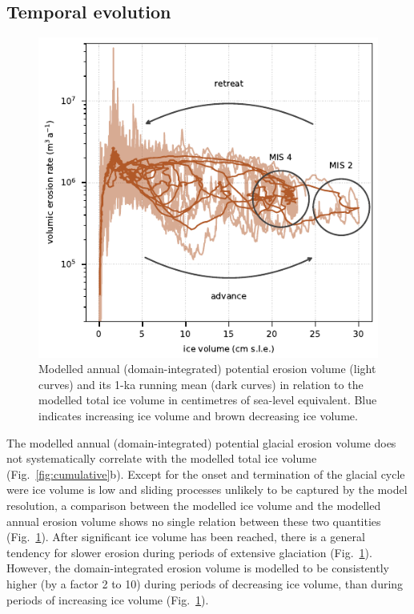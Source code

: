 \documentclass[esurf, manuscript]{copernicus}
\begin{document}
\subsection{Temporal evolution}

    \begin{figure}
      \centerline{\includegraphics{alpero_evolution}}
      \caption{%
        Modelled annual (domain-integrated) potential erosion volume (light
        curves) and its 1-ka running mean (dark curves) in relation to the
        modelled total ice volume in centimetres of sea-level equivalent. Blue
        indicates increasing ice volume and brown decreasing ice volume.}
      \label{fig:evolution}
    \end{figure}

    The modelled annual (domain-integrated) potential glacial erosion volume
    does not systematically correlate with the modelled total ice volume
    (Fig.~\ref{fig:cumulative}b). Except for the onset and termination of the
    glacial cycle were ice volume is low and sliding processes unlikely to be
    captured by the model resolution, a comparison between the modelled ice
    volume and the modelled annual erosion volume shows no single relation
    between these two quantities (Fig.~\ref{fig:evolution}). After significant
    ice volume has been reached, there is a general tendency for slower erosion
    during periods of extensive glaciation (Fig.~\ref{fig:evolution}). However,
    the domain-integrated erosion volume is modelled to be consistently higher
    (by a factor 2 to 10) during periods of decreasing ice volume, than during
    periods of increasing ice volume (Fig.~\ref{fig:evolution}).
\end{document}
